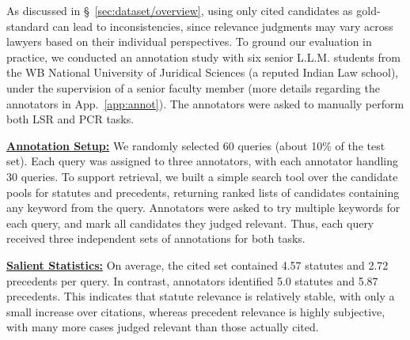 
As discussed in \S~\ref{sec:dataset/overview}, using only cited candidates as gold-standard can lead to inconsistencies, since relevance judgments may vary across lawyers based on their individual perspectives. To ground our evaluation in practice, we conducted an annotation study with six senior L.L.M. students from the WB National University of Juridical Sciences (a reputed Indian Law school), under the supervision of a senior faculty member (more details regarding the annotators in App.~\ref{app:annot}). The annotators were asked to manually perform both LSR and PCR tasks.  

\vspace{1mm}
\noindent\underline{\textbf{Annotation Setup:}} We randomly selected 60 queries (about 10\% of the test set). Each query was assigned to three annotators, with each annotator handling 30 queries. To support retrieval, we built a simple search tool over the candidate pools for statutes and precedents, returning ranked lists of candidates containing any keyword from the query. Annotators were asked to try multiple keywords for each query, and mark all candidates they judged relevant. Thus, each query received three independent sets of annotations for both tasks.  

\vspace{1mm}
\noindent\underline{\textbf{Salient Statistics:}} On average, the cited set contained 4.57 statutes and 2.72 precedents per query. In contrast, annotators identified 5.0 statutes and 5.87 precedents. This indicates that statute relevance is relatively stable, with only a small increase over citations, whereas precedent relevance is highly subjective, with many more cases judged relevant than those actually cited.  

